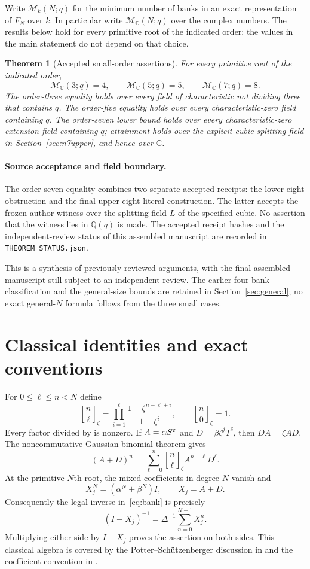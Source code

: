 \documentclass[11pt,letterpaper]{article}
\newtheorem{theorem}{Theorem}[section]
\theoremstyle{definition}\newtheorem{definition}[theorem]{Definition}
\newcommand{\C}{\mathbb C}\newcommand{\Q}{\mathbb Q}\newcommand{\Z}{\mathbb Z}
\newcommand{\gb}[3]{\genfrac{[}{]}{0pt}{}{#1}{#2}_{#3}}
\newcommand{\M}{\mathcal M}
\begin{document}
Write $\M_k(N;q)$ for the minimum number of banks in an exact representation of $F_N$ over $k$. In particular write $\M_{\C}(N;q)$ over the complex numbers. The results below hold for every primitive root of the indicated order; the values in the main statement do not depend on that choice.

\begin{theorem}[Accepted small-order assertions]\label{thm:main}
For every primitive root of the indicated order,
\[
 \M_{\C}(3;q)=4,\qquad \M_{\C}(5;q)=5,
 \qquad \M_{\C}(7;q)=8.
\]
The order-three equality holds over every field of characteristic not dividing three that contains $q$. The order-five equality holds over every characteristic-zero field containing $q$. The order-seven lower bound holds over every characteristic-zero extension field containing $q$; attainment holds over the explicit cubic splitting field in Section~\ref{sec:n7upper}, and hence over $\C$.
\end{theorem}

\paragraph{Source acceptance and field boundary.}
The order-seven equality combines two separate accepted receipts: the lower-eight obstruction and the final upper-eight literal construction. The latter accepts the frozen author witness over the splitting field $L$ of the specified cubic. No assertion that the witness lies in $\Q(q)$ is made. The accepted receipt hashes and the independent-review status of this assembled manuscript are recorded in \texttt{THEOREM\_STATUS.json}.

This is a synthesis of previously reviewed arguments, with the final assembled manuscript still subject to an independent review. The earlier four-bank classification and the general-size bounds are retained in Section~\ref{sec:general}; no exact general-$N$ formula follows from the three small cases.

\section{Classical identities and exact conventions}\label{sec:algebra}

For $0\leq\ell\leq n<N$ define
\[
 \gb n\ell\zeta=\prod_{i=1}^{\ell}
 \frac{1-\zeta^{n-\ell+i}}{1-\zeta^i},
 \qquad \gb n0\zeta=1.
\]
Every factor divided by is nonzero. If $A=\alpha S^\varepsilon$ and $D=\beta\zeta^jT^\delta$, then $DA=\zeta AD$. The noncommutative Gaussian-binomial theorem gives
\[
 (A+D)^n=\sum_{\ell=0}^n\gb n\ell\zeta A^{n-\ell}D^\ell.
\]
At the primitive $N$th root, the mixed coefficients in degree $N$ vanish and
\[
 X_j^N=(\alpha^N+\beta^N)I,\qquad X_j=A+D.
\]
Consequently the legal inverse in~\eqref{eq:bank} is precisely
\begin{equation}\label{eq:inverse}
 (I-X_j)^{-1}=\Delta^{-1}\sum_{n=0}^{N-1}X_j^n.
\end{equation}
Multiplying either side by $I-X_j$ proves the assertion on both sides. This classical algebra is covered by the Potter--Sch\"utzenberger discussion in \cite[Theorems 1--2]{HMS} and the coefficient convention in \cite[Proposition 1]{Schlosser}.
\end{document}
